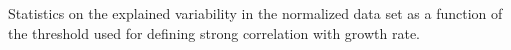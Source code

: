 \label{fig:threshold}
  Statistics on the explained variability in the normalized data set as a function of the threshold used for defining strong correlation with growth rate.
